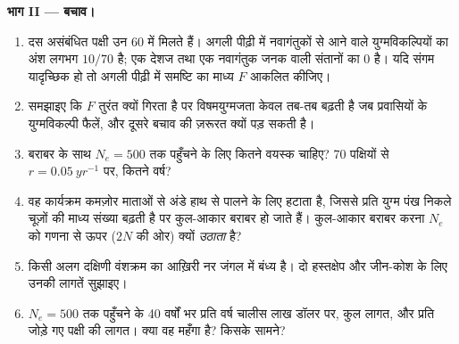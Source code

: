 \begin{problem}
\medskip
\noindent\textbf{भाग II --- बचाव।}
\begin{enumerate}[resume]
  \item दस असंबंधित पक्षी उन 60 में मिलते हैं। अगली पीढ़ी में
        नवागंतुकों से आने वाले युग्मविकल्पियों का अंश लगभग $10/70$ है;
        एक देशज तथा एक नवागंतुक जनक वाली संतानों का 
        $0$ है। यदि संगम यादृच्छिक हो तो अगली पीढ़ी में समष्टि का माध्य
        $F$ आकलित कीजिए।
  \item समझाइए कि $F$ तुरंत क्यों गिरता है पर विषमयुग्मजता केवल
        तब-तब बढ़ती है जब प्रवासियों के युग्मविकल्पी फैलें, और दूसरे
        बचाव की ज़रूरत क्यों पड़ सकती है।
  \item बराबर  के साथ $N_{e} = 500$ तक पहुँचने के लिए कितने
        वयस्क चाहिए? 70 पक्षियों से $r = \qty{0.05}{yr^{-1}}$ पर, कितने
        वर्ष?
  \item वह कार्यक्रम कमज़ोर माताओं से अंडे हाथ से पालने के लिए हटाता है,
        जिससे प्रति युग्म पंख निकले चूज़ों की माध्य संख्या बढ़ती है पर
        कुल-आकार बराबर हो जाते हैं। कुल-आकार बराबर करना $N_{e}$ को गणना
        से ऊपर ($2N$ की ओर) क्यों \emph{उठाता} है?
  \item किसी अलग दक्षिणी वंशक्रम का आख़िरी नर जंगल में बंध्य है। दो
        हस्तक्षेप और जीन-कोश के लिए उनकी लागतें सुझाइए।
  \item $N_{e} = 500$ तक पहुँचने के 40 वर्षों भर प्रति वर्ष चालीस लाख
        डॉलर पर, कुल लागत, और प्रति जोड़े गए पक्षी की लागत। क्या वह
        महँगा है? किसके सामने?
\end{enumerate}


\end{problem}
